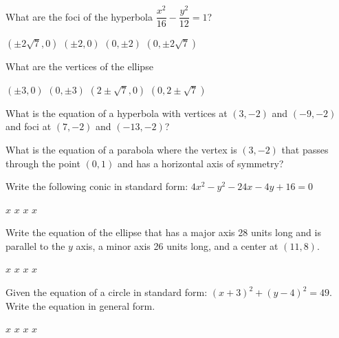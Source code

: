 \documentclass[10pt]{exam}
\begin{document}
\begin{questions}
\question What are the foci of the hyperbola $\dfrac{x^2}{16}-\dfrac{y^2}{12} = 1$?

\begin{oneparchoices}
	\choice $(\pm 2\sqrt7,0)$
	\choice $(\pm 2,0)$
	\choice $(0, \pm 2)$
	\choice $(0, \pm 2\sqrt7)$
\end{oneparchoices} \answerline

\question  What are the vertices of the ellipse 

\begin{oneparchoices}
	\choice $(\pm 3,0)$
	\choice $(0,\pm3)$
	\choice $(2 \pm \sqrt7, 0)$
	\choice $(0, 2 \pm \sqrt7)$
\end{oneparchoices} \answerline

\question What is the equation of a hyperbola with vertices at $(3,-2)$ and $(-9,-2)$ and foci at $(7,-2)$ and $(-13,-2)$?

\begin{oneparchoices}
	\choice {}
	\choice {}
	\choice {}
	\choice {}
\end{oneparchoices} \answerline

\question What is the equation of a parabola where the vertex is $(3, -2)$ that passes through the point
 $(0, 1)$ and has a horizontal axis of symmetry?

 \begin{oneparchoices}
\choice {}
\choice {}
\choice {}
\choice {}
\choice {}
\end{oneparchoices} \answerline

\question Write the following conic in standard form: $4x^2 - y^2 - 24x - 4y + 16 = 0$

\begin{oneparchoices}
	\choice $x$
	\choice $x$
	\choice $x$
	\choice $x$
\end{oneparchoices} \answerline

\question Write the equation of the ellipse that has a major axis 28 units long and is parallel to the $y$ axis,
 a minor axis 26 units long, and a center at $(11, 8)$.

\begin{oneparchoices}
	\choice $x$
	\choice $x$
	\choice $x$
	\choice $x$
\end{oneparchoices} \answerline

\question Given the equation of a circle in standard form: $(x + 3)^2 + (y - 4)^2 = 49$. Write the equation in general form.

\begin{oneparchoices}
	\choice $x$
	\choice $x$
	\choice $x$
	\choice $x$
\end{oneparchoices} \answerline


\end{questions}
\end{document}
